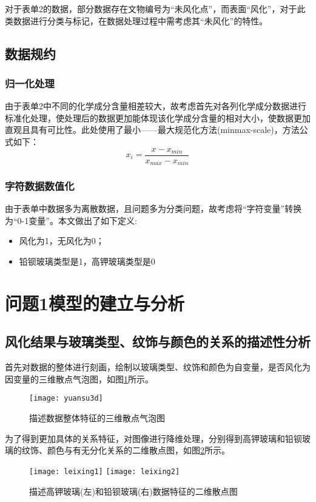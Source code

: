 \documentclass[withoutpreface,bwprint]{cumcmthesis} %
\begin{document}
对于表单2的数据，部分数据存在文物编号为“未风化点”，而表面“风化”，对于此类数据进行分类与标记，在数据处理过程中需考虑其“未风化”的特性。


\subsection{数据规约}
\subsubsection{归一化处理}
由于表单2中不同的化学成分含量相差较大，故考虑首先对各列化学成分数据进行标准化处理，使处理后的数据更加能体现该化学成分含量的相对大小，使数据更加直观且具有可比性。此处使用了最小——最大规范化方法(minmax-scale)，方法公式如下： $$ x_{i} = \frac{x-x_{min}}{x_{max}-x_{min}}$$

\subsubsection{字符数据数值化}

由于表单中数据多为离散数据，且问题多为分类问题，故考虑将“字符变量”转换为“0-1变量”。本文做出了如下定义:

\begin{itemize}
	\item 风化为1，无风化为0；
	\item 铅钡玻璃类型是1，高钾玻璃类型是0
\end{itemize}

\section{问题1模型的建立与分析}
\subsection{风化结果与玻璃类型、纹饰与颜色的关系的描述性分析}
首先对数据的整体进行刻画，绘制以玻璃类型、纹饰和颜色为自变量，是否风化为因变量的三维散点气泡图，如图\ref{yuansu3d}所示。

\begin{figure}[!h]
	\centering
	\texttt{[image: yuansu3d]}
	\caption{描述数据整体特征的三维散点气泡图}
	\label{yuansu3d}
\end{figure}


为了得到更加具体的关系特征，对图像进行降维处理，分别得到高钾玻璃和铅钡玻璃的纹饰、颜色与有无分化关系的二维散点图，如图\ref{leixing}所示。

\begin{figure}[!h]
	\centering
	\texttt{[image: leixing1]}
	\texttt{[image: leixing2]}
	\caption{描述高钾玻璃(左)和铅钡玻璃(右)数据特征的二维散点图}
	\label{leixing}
\end{figure}
\end{document}

